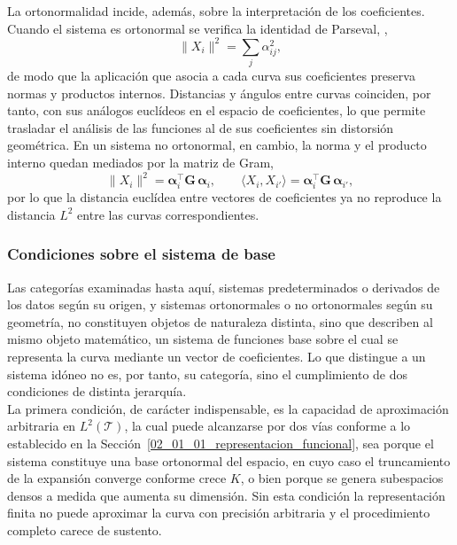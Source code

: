 La ortonormalidad incide, además, sobre la interpretación de los coeficientes. Cuando el sistema es ortonormal se verifica la identidad de Parseval, \cite{02_01_kokoszka2017introduction},
\begin{equation}
    \|X_i\|^2 = \sum_{j}\alpha_{ij}^2,
\end{equation}
de modo que la aplicación que asocia a cada curva sus coeficientes preserva normas y productos internos. Distancias y ángulos entre curvas coinciden, por tanto, con sus análogos euclídeos en el espacio de coeficientes, lo que permite trasladar el análisis de las funciones al de sus coeficientes sin distorsión geométrica. En un sistema no ortonormal, en cambio, la norma y el producto interno quedan mediados por la matriz de Gram,
\begin{equation}
    \|X_i\|^2 = \boldsymbol{\alpha}_i^\top \mathbf{G}\,\boldsymbol{\alpha}_i,
    \qquad
    \langle X_i, X_{i'}\rangle = \boldsymbol{\alpha}_i^\top \mathbf{G}\,\boldsymbol{\alpha}_{i'},
\end{equation}
por lo que la distancia euclídea entre vectores de coeficientes ya no reproduce la distancia $L^2$ entre las curvas correspondientes.

\subsubsection{Condiciones sobre el sistema de base}
\label{02_01_02_02_condiciones_sistema_base}
Las categorías examinadas hasta aquí, sistemas predeterminados o derivados de los datos según su origen, y sistemas ortonormales o no ortonormales según su geometría, no constituyen objetos de naturaleza distinta, sino que describen al mismo objeto matemático, un sistema de funciones base sobre el cual se representa la curva mediante un vector de coeficientes. Lo que distingue a un sistema idóneo no es, por tanto, su categoría, sino el cumplimiento de dos condiciones de distinta jerarquía.\\

La primera condición, de carácter indispensable, es la capacidad de aproximación arbitraria en $L^2(\mathcal{T})$, la cual puede alcanzarse por dos vías conforme a lo establecido en la Sección~\ref{02_01_01_representacion_funcional}, sea porque el sistema constituye una base ortonormal del espacio, en cuyo caso el truncamiento de la expansión converge conforme crece $K$, o bien porque se genera subespacios densos a medida que aumenta su dimensión. Sin esta condición la representación finita no puede aproximar la curva con precisión arbitraria y el procedimiento completo carece de sustento.\\


